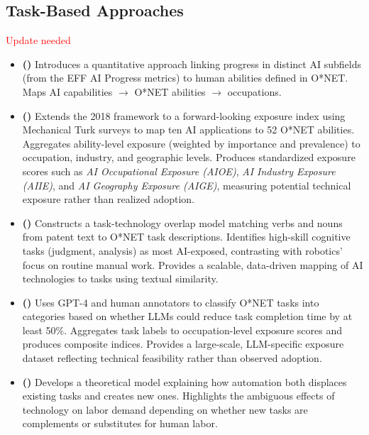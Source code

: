 \documentclass[12pt]{article}
\begin{document}
\subsection{Task-Based Approaches}\textcolor{red}{Update needed}
\fi
\begin{itemize}[leftmargin=*]
    \item \textbf{(\cite{felten2018method})}  
    Introduces a quantitative approach linking progress in distinct AI subfields (from the EFF AI Progress metrics) to human abilities defined in O*NET.  
    Maps AI capabilities $\rightarrow$ O*NET abilities $\rightarrow$ occupations. 

    \item \textbf{(\cite{felten2021aioe})}  
    Extends the 2018 framework to a forward-looking exposure index using Mechanical Turk surveys to map ten AI applications to 52 O*NET abilities.  
    Aggregates ability-level exposure (weighted by importance and prevalence) to occupation, industry, and geographic levels.  
    Produces standardized exposure scores such as \textit{AI Occupational Exposure (AIOE)}, \textit{AI Industry Exposure (AIIE)}, and \textit{AI Geography Exposure (AIGE)}, measuring potential technical exposure rather than realized adoption.

    \item \textbf{(\cite{webb2020impact})}  
    Constructs a task-technology overlap model matching verbs and nouns from patent text to O*NET task descriptions.  
    Identifies high-skill cognitive tasks (judgment, analysis) as most AI-exposed, contrasting with robotics’ focus on routine manual work.  
    Provides a scalable, data-driven mapping of AI technologies to tasks using textual similarity.

    \item \textbf{(\cite{eloundou2024gpts})}  
    Uses GPT-4 and human annotators to classify O*NET tasks into categories based on whether LLMs could reduce task completion time by at least 50\%. Aggregates task labels to occupation-level exposure scores and produces composite indices.  
    Provides a large-scale, LLM-specific exposure dataset reflecting technical feasibility rather than observed adoption.
    \item \textbf{(\cite{acemoglu2019automation})}  
    Develops a theoretical model explaining how automation both displaces existing tasks and creates new ones.  
    Highlights the ambiguous effects of technology on labor demand depending on whether new tasks are complements or substitutes for human labor.  
\end{itemize}
\end{document}
